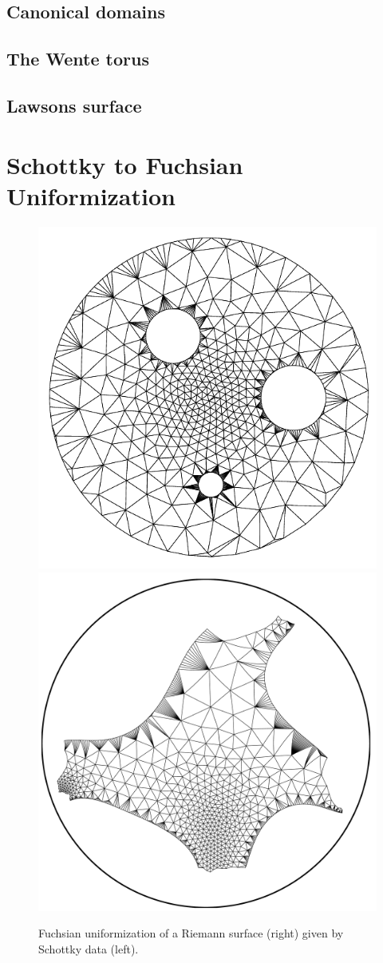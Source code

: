 \subsection{Canonical domains}
\subsection{The Wente torus}
\subsection{Lawsons surface}



\section{Schottky to Fuchsian Uniformization}

\begin{figure}
	\centering
	\includegraphics[width=0.4\linewidth]{image/schottky/schottky_domain2.pdf}
	\includegraphics[width=0.4\linewidth]{image/schottky/schottky01.pdf}
	\caption{Fuchsian uniformization of a Riemann surface (right) given by Schottky data (left).}
	\label{fig:fuchsian_to_schottky}
\end{figure}


